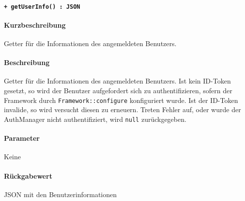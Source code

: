 \paragraph{\texttt{+ getUserInfo() : JSON}}\label{AP_Framework_getUserInfo}%
\paragraph*{Kurzbeschreibung}
Getter für die Informationen des angemeldeten Benutzers.
\paragraph*{Beschreibung}
Getter für die Informationen des angemeldeten Benutzers.
Ist kein ID-Token gesetzt, so wird der Benutzer aufgefordert sich zu authentifizieren, sofern der Framework durch \verb#Framework::configure# konfiguriert wurde.
Ist der ID-Token invalide, so wird versucht diesen zu erneuern.
Treten Fehler auf, oder wurde der AuthManager nicht authentifiziert, wird \verb#null# zurückgegeben.
\paragraph*{Parameter}
Keine
\paragraph*{Rückgabewert}
JSON mit den Benutzerinformationen